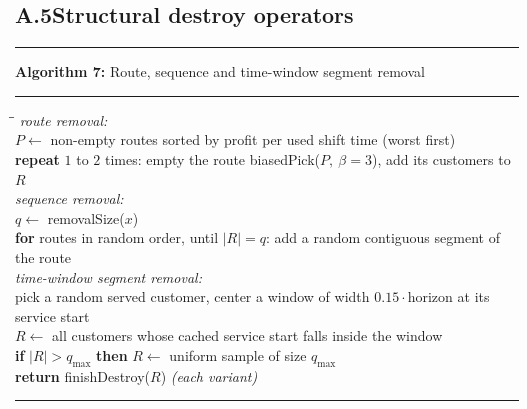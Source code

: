\documentclass[10pt, a4paper]{article}
\begin{document}
\subsection*{A.5\quad Structural destroy operators}

\begin{center}
\begin{minipage}{0.92\linewidth}
\small
\hrule\vspace{2pt}
\textbf{Algorithm 7:} Route, sequence and time-window segment removal
\vspace{2pt}\hrule\vspace{4pt}
\begin{tabbing}
\hspace{1.2em}\=\hspace{1.2em}\=\kill
\emph{route removal:}\\
\>$P \leftarrow$ non-empty routes sorted by profit per used shift time
  (worst first)\\
\>\textbf{repeat} $1$ to $2$ times: empty the route biasedPick($P,\
  \beta{=}3$), add its customers to $R$\\[3pt]
\emph{sequence removal:}\\
\>$q \leftarrow$ removalSize($x$)\\
\>\textbf{for} routes in random order, until $|R| = q$: add a random
  contiguous segment of the route\\[3pt]
\emph{time-window segment removal:}\\
\>pick a random served customer, center a window of width
  $0.15 \cdot \text{horizon}$ at its service start\\
\>$R \leftarrow$ all customers whose cached service start falls inside the
  window\\
\>\textbf{if} $|R| > q_{\max}$ \textbf{then} $R \leftarrow$ uniform sample
  of size $q_{\max}$\\[3pt]
\textbf{return} finishDestroy($R$) \quad\emph{(each variant)}
\end{tabbing}
\vspace{2pt}\hrule
\end{minipage}
\end{center}
\end{document}
